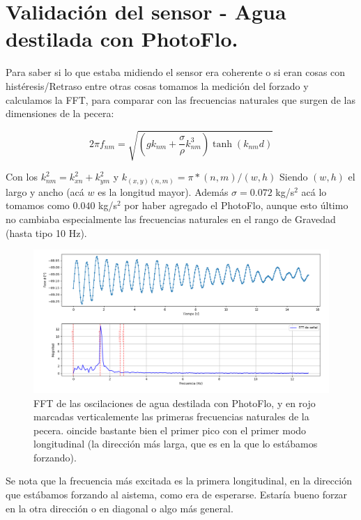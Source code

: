 \section{Validación del sensor - Agua destilada con PhotoFlo.}
Para saber si lo que estaba midiendo el sensor era coherente o si eran cosas con histéresis/Retraso entre otras cosas tomamos la medición del forzado y calculamos la FFT, para comparar con las frecuencias naturales que surgen de las dimensiones de la pecera:

\begin{equation}
	2\pi f_{nm} = \sqrt{\left(gk_{nm}+\frac{\sigma}{\rho}k_{nm}^3\right)\tanh(k_{nm}d)}
\end{equation}

Con los $k_{nm}^2=k_{xn}^2+k_{ym}^2$ y $k_{(x,y)(n,m)} = \pi*(n,m)/(w,h)$ Siendo $(w,h)$ el largo y ancho (acá $w$ es la longitud mayor). Además $\sigma=0.072$ kg/s$^2$ acá lo tomamos como $0.040$ kg/s$^2$ por haber agregado el PhotoFlo, aunque esto último no cambiaba especialmente las frecuencias naturales en el rango de Gravedad (hasta tipo 10 Hz). %

\begin{figure}[!ht]
	\centering
	\includegraphics[width=0.87\linewidth]{Figures/19_05_2025/Caracterización_validación_con_PhotoFlo}
	\caption{FFT de las oscilaciones de agua destilada con PhotoFlo, y en rojo marcadas verticalemente las primeras frecuencias naturales de la pecera. oincide bastante bien el primer pico con el primer modo longitudinal (la dirección más larga, que es en la que lo estábamos forzando).}
	\label{fig:caracterizacionvalidacionconphotoflo}
\end{figure}

Se nota que la frecuencia más excitada es la primera longitudinal, en la dirección que estábamos forzando al aistema, como era de esperarse. Estaría bueno forzar en la otra dirección o en diagonal o algo más general.



